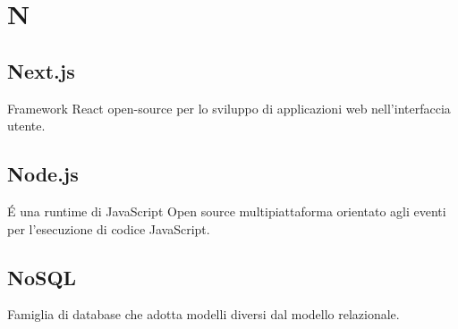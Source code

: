 \section*{N}
\markright{}
\subsection*{Next.js}
Framework React open-source per lo sviluppo di applicazioni web nell'interfaccia utente.
\subsection*{Node.js}
\'E una runtime di JavaScript Open source multipiattaforma orientato agli eventi per l'esecuzione di codice JavaScript.
\subsection*{NoSQL}
Famiglia di database che adotta modelli diversi dal modello relazionale.